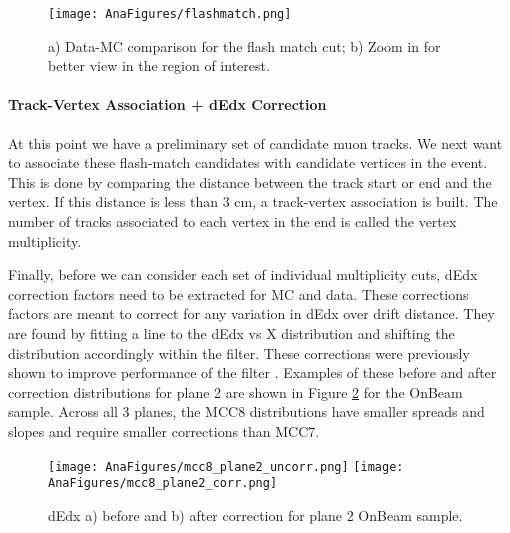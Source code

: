 \documentclass[12pt]{article}
\begin{document}
\begin{figure}[h!]
\centering
\texttt{[image: AnaFigures/flashmatch.png]}
\caption{a) Data-MC comparison for the flash match cut; b) Zoom in for better view in the region of interest. }
\label{fig:flashmatch}
\end{figure}

\paragraph{Track-Vertex Association + dEdx Correction}
At this point we have a preliminary set of candidate muon tracks. We next want to associate these flash-match candidates with candidate vertices in the event. This is done by comparing the distance between the track start or end and the vertex. If this distance is less than 3 cm, a track-vertex association is built.  The number of tracks associated to each vertex in the end is called the vertex multiplicity.  
\par Finally, before we can consider each set of individual multiplicity cuts, dEdx correction factors need to be extracted for MC and data. These corrections factors are meant to correct for any variation in dEdx over drift distance.  They are found by fitting a line to the dEdx vs X distribution and shifting the distribution accordingly within the filter. These corrections were previously shown to improve performance of the filter \cite{bib:6172}. Examples of these before and after correction distributions for plane 2 are shown in Figure \ref{fig:mcc8_corr} for the OnBeam sample. Across all 3 planes, the MCC8 distributions have smaller spreads and slopes and require smaller corrections than MCC7.

\begin{figure}[h!]
\centering
\texttt{[image: AnaFigures/mcc8\_plane2\_uncorr.png]}
\hspace{1 mm}
\texttt{[image: AnaFigures/mcc8\_plane2\_corr.png]}
\caption{dEdx a) before and b) after correction for plane 2 OnBeam sample. }
\label{fig:mcc8_corr}
\end{figure}
\end{document}
